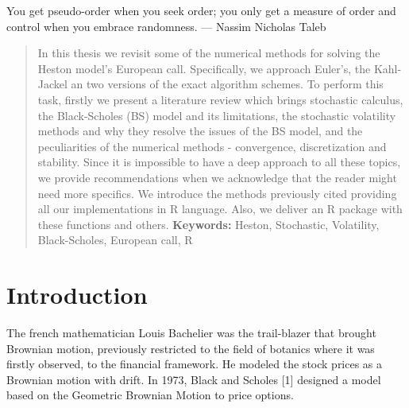 \documentclass[12pt,twoside]{reedthesis}
\theoremstyle{definition}
\theoremstyle{definition}
\theoremstyle{remark}
\begin{document}
\begin{acknowledgements}
      You get pseudo-order when you seek order; you only get a measure of
      order and control when you embrace randomness. --- Nassim Nicholas Taleb
    \end{acknowledgements}
  
      \hypersetup{linkcolor=black}
    \setcounter{tocdepth}{2}
    \tableofcontents
  
      \listoftables
  
      \listoffigures
      \begin{abstract}
      In this thesis we revisit some of the numerical methods for solving the
      Heston model's European call. Specifically, we approach Euler's, the
      Kahl-Jackel an two versions of the exact algorithm schemes. To perform
      this task, firstly we present a literature review which brings
      stochastic calculus, the Black-Scholes (BS) model and its limitations,
      the stochastic volatility methods and why they resolve the issues of the
      BS model, and the peculiarities of the numerical methods - convergence,
      discretization and stability. Since it is impossible to have a deep
      approach to all these topics, we provide recommendations when we
      acknowledge that the reader might need more specifics. We introduce the
      methods previously cited providing all our implementations in R
      language. Also, we deliver an R package with these functions and others.
      \newline \newline \textbf{Keywords:} Heston, Stochastic, Volatility,
      Black-Scholes, European call, R
    \end{abstract}
  
  \mainmatter %
  \pagestyle{fancyplain} %

  \newcommand{\source}[1]{\caption*{Source: {#1}} }
  
  
  
  \chapter*{Introduction}\label{intro}
  
  The french mathematician Louis Bachelier was the trail-blazer that
  brought Brownian motion, previously restricted to the field of botanics
  where it was firstly observed, to the financial framework. He modeled
  the stock prices as a Brownian motion with drift. In 1973, Black and
  Scholes {[}1{]} designed a model based on the Geometric Brownian Motion
  to price options.
  
\end{document}
